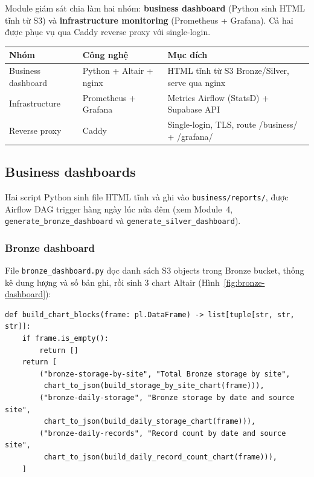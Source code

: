Module giám sát chia làm hai nhóm: \textbf{business dashboard} (Python sinh HTML
tĩnh từ S3) và \textbf{infrastructure monitoring} (Prometheus + Grafana).
Cả hai được phục vụ qua Caddy reverse proxy với single-login.

\begin{longtable}{p{3.5cm} p{3cm} p{7.5cm}}
\toprule
\textbf{Nhóm} & \textbf{Công nghệ} & \textbf{Mục đích} \\
\midrule
\endhead
Business dashboard & Python + Altair + nginx & HTML tĩnh từ S3 Bronze/Silver, serve qua nginx \\
Infrastructure & Prometheus + Grafana & Metrics Airflow (StatsD) + Supabase API \\
Reverse proxy & Caddy & Single-login, TLS, route /business/ + /grafana/ \\
\bottomrule
\end{longtable}

\subsection{Business dashboards}
\label{subsec:business-dashboards}

Hai script Python sinh file HTML tĩnh và ghi vào
\texttt{business/reports/}, được Airflow DAG trigger hàng ngày lúc nửa đêm
(xem Module~4, \texttt{generate\_bronze\_dashboard} và
\texttt{generate\_silver\_dashboard}).

\subsubsection{Bronze dashboard}

File \texttt{bronze\_dashboard.py}
đọc danh sách S3 objects trong Bronze bucket, thống kê dung lượng và số bản
ghi, rồi sinh 3 chart Altair (Hình~\ref{fig:bronze-dashboard}):

\begin{lstlisting}[style=pystyle, caption={Bronze dashboard — 3 chart chính}]
def build_chart_blocks(frame: pl.DataFrame) -> list[tuple[str, str, str]]:
    if frame.is_empty():
        return []
    return [
        ("bronze-storage-by-site", "Total Bronze storage by site",
         chart_to_json(build_storage_by_site_chart(frame))),
        ("bronze-daily-storage", "Bronze storage by date and source site",
         chart_to_json(build_daily_storage_chart(frame))),
        ("bronze-daily-records", "Record count by date and source site",
         chart_to_json(build_daily_record_count_chart(frame))),
    ]
\end{lstlisting}


